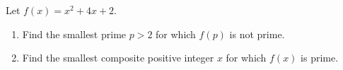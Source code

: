 Let $f(x)=x^2+4x+2$.
\begin{enumerate}
\item[(a)] Find the smallest prime $p>2$ for which $f(p)$ is not prime.
\item[(b)] Find the smallest composite positive integer $x$ for which $f(x)$ is prime.
\end{enumerate}
